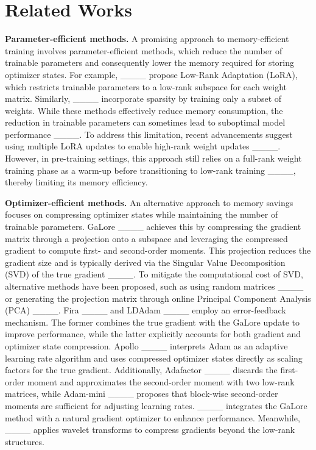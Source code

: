 \section{Related Works}

\textbf{Parameter-efficient methods.} 
A promising approach to memory-efficient training involves parameter-efficient methods, which reduce the number of trainable parameters and consequently lower the memory required for storing optimizer states. For example, ____ propose Low-Rank Adaptation (LoRA), which restricts trainable parameters to a low-rank subspace for each weight matrix. Similarly, ____ incorporate sparsity by training only a subset of weights. While these methods effectively reduce memory consumption, the reduction in trainable parameters can sometimes lead to suboptimal model performance ____. To address this limitation, recent advancements suggest using multiple LoRA updates to enable high-rank weight updates ____. However, in pre-training settings, this approach still relies on a full-rank weight training phase as a warm-up before transitioning to low-rank training ____, thereby limiting its memory efficiency.

\textbf{{Optimizer-efficient methods.}} An alternative approach to memory savings focuses on compressing optimizer states while maintaining the number of trainable parameters. GaLore ____ achieves this by compressing the gradient matrix through a projection onto a subspace and leveraging the compressed gradient to compute first- and second-order moments. This projection reduces the gradient size and is typically derived via the Singular Value Decomposition (SVD) of the true gradient ____. To mitigate the computational cost of SVD, alternative methods have been proposed, such as using random matrices ____ or generating the projection matrix through online Principal Component Analysis (PCA) ____. {Fira ____ and LDAdam ____ employ an error-feedback mechanism. The former combines the true gradient with the GaLore update to improve performance, while the latter explicitly accounts for both gradient and optimizer state compression.} Apollo ____ interprets Adam as an adaptive learning rate algorithm and uses compressed optimizer states directly as scaling factors for the true gradient. Additionally, Adafactor ____ discards the first-order moment and approximates the second-order moment with two low-rank matrices, while Adam-mini ____ proposes that block-wise second-order moments are sufficient for adjusting learning rates. ____ integrates the GaLore method with a natural gradient optimizer to enhance performance. Meanwhile, ____ applies wavelet transforms to compress gradients beyond the low-rank structures.

